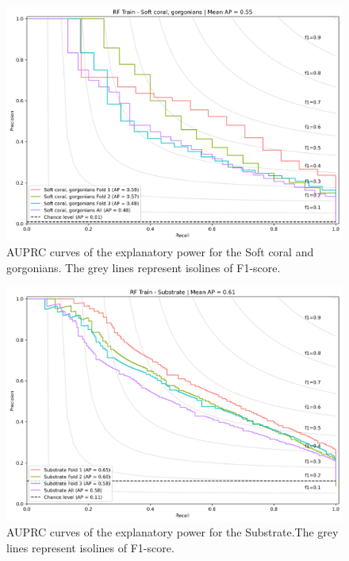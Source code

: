 \begin{figure}
\hypertarget{fig:chap3figS33}{%
\centering
\includegraphics{03-Chapitre3/figures/supplementary/03-precision_recall_curve_train_rf_Soft coral, gorgonians.png}
\caption{AUPRC curves of the explanatory power for the Soft coral and
gorgonians. The grey lines represent isolines of
F1-score.}\label{fig:chap3figS33}
}
\end{figure}

\begin{figure}
\hypertarget{fig:chap3figS34}{%
\centering
\includegraphics{03-Chapitre3/figures/supplementary/03-precision_recall_curve_train_rf_Substrate.png}
\caption{AUPRC curves of the explanatory power for the Substrate.The
grey lines represent isolines of F1-score.}\label{fig:chap3figS34}
}
\end{figure}

